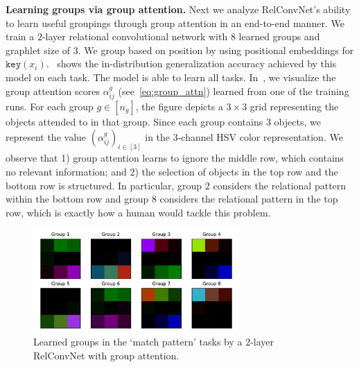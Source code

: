 \textbf{Learning groups via group attention.} Next we analyze RelConvNet's ability to learn useful groupings through group attention in an end-to-end manner. We train a $2$-layer relational convolutional network with $8$ learned groups and graphlet size of $3$. We group based on position by using positional embeddings for $\mathtt{key}(x_i)$.~ shows the in-distribution generalization accuracy achieved by this model on each task. The model is able to learn all tasks. In~, we visualize the group attention scores $\alpha_{ij}^g$ (see~\cref{eq:group_attn}) learned from one of the training runs. For each group $g \in [n_g]$, the figure depicts a $3 \times 3$ grid representing the objects attended to in that group. Since each group contains $3$ objects, we represent the value $(\alpha_{ij}^g)_{i \in [3]}$ in the $3$-channel HSV color representation. We observe that 1) group attention learns to ignore the middle row, which contains no relevant information; and 2) the selection of objects in the top row and the bottom row is structured. In particular, group $2$ considers the relational pattern within the bottom row and group $8$ considers the relational pattern in the top row, which is exactly how a human would tackle this problem.

\begin{figure}
    \centering
    \includegraphics[width=0.7\textwidth]{figs/group_attn_figs/match_patt_group_attn_map.pdf}
    \caption{Learned groups in the `match pattern' tasks by a 2-layer RelConvNet with group attention.}\label{fig:matchpatt_groupattn}
\end{figure}
